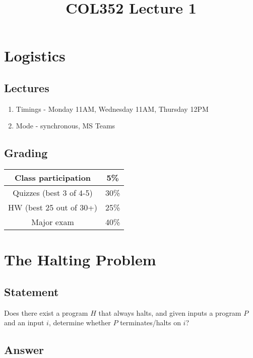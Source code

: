 \documentclass[a4paper]{article}
\title{\textbf{COL352 Lecture 1}}
\date{}
\begin{document}
\maketitle
\tableofcontents

\section{Logistics}

\subsection{Lectures}

\begin{enumerate}
    \item Timings - Monday 11AM, Wednesday 11AM, Thursday 12PM
    \item Mode - synchronous, MS Teams
\end{enumerate}

\subsection{Grading}

\begin{center}
\begin{tabular}{|c|c|}
    \hline
    Class participation     &  5\% \\
    \hline
    Quizzes (best 3 of 4-5) & 30\% \\
    \hline
    HW (best 25 out of 30+) & 25\% \\
    \hline
    Major exam	            & 40\% \\
    \hline
\end{tabular}
\end{center}

\section{The Halting Problem}

\subsection{Statement}

Does there exist a program $H$ that always halts, and given inputs a program $P$ and an input $i$, determine whether $P$ terminates/halts on $i$?

\subsection{Answer}
\end{document}
